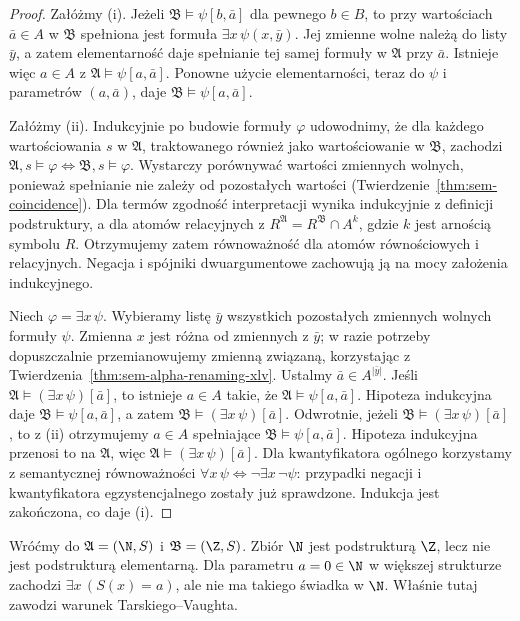 \begin{proof}
Załóżmy (i). Jeżeli $\mathfrak B\models\psi[b,\bar a]$
dla pewnego $b\in B$, to przy wartościach $\bar a\in A$
w $\mathfrak B$ spełniona jest formuła
$\exists x\,\psi(x,\bar y)$. Jej zmienne wolne należą do
listy $\bar y$, a zatem elementarność daje spełnianie
tej samej formuły w $\mathfrak A$ przy $\bar a$.
Istnieje więc $a\in A$ z
$\mathfrak A\models\psi[a,\bar a]$.
Ponowne użycie elementarności, teraz do $\psi$ i
parametrów $(a,\bar a)$, daje
$\mathfrak B\models\psi[a,\bar a]$.

Załóżmy (ii). Indukcyjnie po budowie formuły $\varphi$
udowodnimy, że dla każdego wartościowania $s$ w
$\mathfrak A$, traktowanego również jako wartościowanie
w $\mathfrak B$, zachodzi
$\mathfrak A,s\models\varphi\iff\mathfrak B,s\models\varphi$.
Wystarczy porównywać wartości zmiennych wolnych, ponieważ
spełnianie nie zależy od pozostałych wartości
(Twierdzenie~\ref{thm:sem-coincidence}).
Dla termów zgodność interpretacji wynika indukcyjnie z
definicji podstruktury, a dla atomów relacyjnych z
$R^{\mathfrak A}=R^{\mathfrak B}\cap A^k$,
gdzie $k$ jest arnością symbolu $R$.
Otrzymujemy zatem równoważność dla atomów równościowych
i relacyjnych. Negacja i spójniki dwuargumentowe
zachowują ją na mocy założenia indukcyjnego.

Niech $\varphi=\exists x\,\psi$. Wybieramy listę
$\bar y$ wszystkich pozostałych zmiennych wolnych
formuły $\psi$. Zmienna $x$ jest różna od zmiennych
z $\bar y$; w razie potrzeby dopuszczalnie przemianowujemy
zmienną związaną, korzystając z
Twierdzenia~\ref{thm:sem-alpha-renaming-xlv}.
Ustalmy $\bar a\in A^{|\bar y|}$.
Jeśli $\mathfrak A\models(\exists x\,\psi)[\bar a]$,
to istnieje $a\in A$ takie, że
$\mathfrak A\models\psi[a,\bar a]$.
Hipoteza indukcyjna daje
$\mathfrak B\models\psi[a,\bar a]$,
a zatem $\mathfrak B\models(\exists x\,\psi)[\bar a]$.
Odwrotnie, jeżeli $\mathfrak B\models(\exists x\,\psi)[\bar a]$,
to z (ii) otrzymujemy $a\in A$ spełniające
$\mathfrak B\models\psi[a,\bar a]$.
Hipoteza indukcyjna przenosi to na $\mathfrak A$,
więc $\mathfrak A\models(\exists x\,\psi)[\bar a]$.
Dla kwantyfikatora ogólnego korzystamy z semantycznej
równoważności
$\forall x\,\psi\iff\neg\exists x\,\neg\psi$:
przypadki negacji i kwantyfikatora egzystencjalnego
zostały już sprawdzone. Indukcja jest zakończona,
co daje (i).
\end{proof}

\begin{przyklad}
Wróćmy do $\mathfrak A=(\N,S)$ i $\mathfrak B=(\Z,S)$.
Zbiór $\N$ jest podstrukturą $\Z$, lecz nie jest
podstrukturą elementarną. Dla parametru $a=0\in\N$
w większej strukturze zachodzi $\exists x\,(S(x)=a)$,
ale nie ma takiego świadka w $\N$.
Właśnie tutaj zawodzi warunek Tarskiego--Vaughta.
\end{przyklad}

